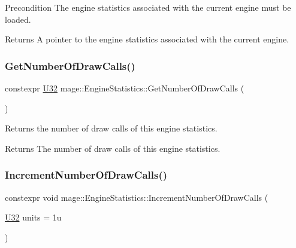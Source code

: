 \begin{DoxyPrecond}{Precondition}
The engine statistics associated with the current engine must be loaded. 
\end{DoxyPrecond}
\begin{DoxyReturn}{Returns}
A pointer to the engine statistics associated with the current engine. 
\end{DoxyReturn}
\hypertarget{classmage_1_1_engine_statistics_a8c9a6691cec0c6544c4fb2e426ab4379}{}\label{classmage_1_1_engine_statistics_a8c9a6691cec0c6544c4fb2e426ab4379} 
\subsubsection{\texorpdfstring{Get\+Number\+Of\+Draw\+Calls()}{GetNumberOfDrawCalls()}}
{\footnotesize\ttfamily constexpr \hyperlink{namespacemage_a41c104c036fba3756a74e19f793eeaa1}{U32} mage\+::\+Engine\+Statistics\+::\+Get\+Number\+Of\+Draw\+Calls (\begin{DoxyParamCaption}{ }\end{DoxyParamCaption})\hspace{0.3cm}{\ttfamily [noexcept]}}

Returns the number of draw calls of this engine statistics.

\begin{DoxyReturn}{Returns}
The number of draw calls of this engine statistics. 
\end{DoxyReturn}
\hypertarget{classmage_1_1_engine_statistics_a3618f9d29278557fb86cb5f6bb159113}{}\label{classmage_1_1_engine_statistics_a3618f9d29278557fb86cb5f6bb159113} 
\subsubsection{\texorpdfstring{Increment\+Number\+Of\+Draw\+Calls()}{IncrementNumberOfDrawCalls()}}
{\footnotesize\ttfamily constexpr void mage\+::\+Engine\+Statistics\+::\+Increment\+Number\+Of\+Draw\+Calls (\begin{DoxyParamCaption}\item[{\hyperlink{namespacemage_a41c104c036fba3756a74e19f793eeaa1}{U32}}]{units = {\ttfamily 1u} }\end{DoxyParamCaption})\hspace{0.3cm}{\ttfamily [noexcept]}}

